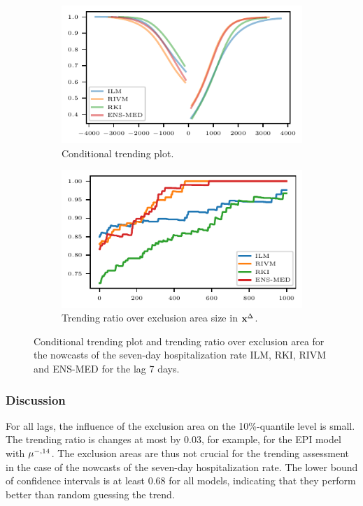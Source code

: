 \begin{figure}
    \centering
    \begin{subfigure}[t]{.48\textwidth}
    \includegraphics{plots/covid_nowcast/40_cond_prob_lag_7}
    \caption{Conditional trending plot.}\label{fig:app-covid-cond-prob-7}
    \end{subfigure}\hfill
    \begin{subfigure}[t]{.48\textwidth}
    \includegraphics{plots/covid_nowcast/40_acc_eps_lag_7}
    \caption{Trending ratio over exclusion area size in $\mathbf{x}^{\Delta}$.}\label{fig:app-covid-trending-ratio-7}
    \end{subfigure}
    \caption{Conditional trending plot and trending ratio over exclusion area for the nowcasts of the seven-day hospitalization rate ILM, RKI, RIVM and ENS-MED for the lag 7 days.}
    \label{fig:app-covid-cond-prob-trending-ratio-7}
\end{figure}



\subsubsection*{Discussion}

For all lags, the influence of the exclusion area on the 10\%-quantile level is small.
The trending ratio is changes at most by 0.03, for example, for the EPI model with $\mu^{-, 14}$.
The exclusion areas are thus not crucial for the trending assessment in the case of the nowcasts of the seven-day hospitalization rate.
The lower bound of confidence intervals is at least 0.68 for all models, indicating that they perform better than random guessing the trend.


